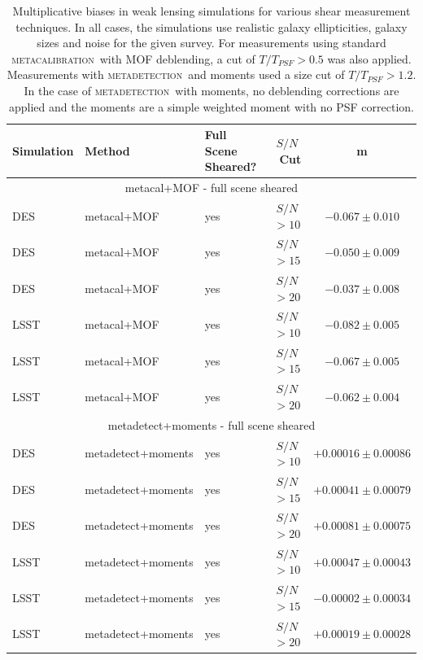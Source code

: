 \documentclass[fleqn,useAMS,usenatbib]{mnras}
\newcommand{\snr}{$S/N$}
\newcommand{\mcal}{\textsc{metacalibration}}
\newcommand{\mdet}{\textsc{metadetection}}
\begin{document}
\begin{table}
  \centering
  \caption{
    Multiplicative biases in weak lensing simulations for various shear
    measurement techniques. In all cases, the simulations use realistic
    galaxy ellipticities, galaxy sizes and noise for the given survey. For measurements using standard \mcal\ with
    MOF deblending, a cut of $T/T_{PSF} > 0.5$ was also applied. Measurements with
    \mdet\ and moments used a size cut of $T/T_{PSF} > 1.2$. In the case of \mdet\ with moments,
    no deblending corrections are applied and the moments are a simple weighted moment
    with no PSF correction.}
  \label{tab:shearmeas}

  \begin{tabular}{|l|l|l|c|c|}
    \hline
    Simulation & Method & Full Scene Sheared? & \snr\ Cut & m \\
    \hline

    \hline
    \multicolumn{5}{c}{metacal+MOF - full scene sheared}\\
    \hline
    DES   & metacal+MOF & yes & \snr$ > 10$ & $-0.067 \pm 0.010$  \\
    DES   & metacal+MOF & yes & \snr$ > 15$ & $-0.050 \pm 0.009$  \\
    DES   & metacal+MOF & yes & \snr$ > 20$ & $-0.037 \pm 0.008$  \\
    \hline
    LSST  & metacal+MOF & yes & \snr$ > 10$ & $-0.082 \pm 0.005$  \\
    LSST  & metacal+MOF & yes & \snr$ > 15$ & $-0.067 \pm 0.005$  \\
    LSST  & metacal+MOF & yes & \snr$ > 20$ & $-0.062 \pm 0.004$  \\
    \hline

    \hline
    \multicolumn{5}{c}{metadetect+moments - full scene sheared}\\
    \hline
    DES   & metadetect+moments & yes & \snr$ > 10$ & $+0.00016 \pm 0.00086$  \\
    DES   & metadetect+moments & yes & \snr$ > 15$ & $+0.00041 \pm 0.00079$  \\
    DES   & metadetect+moments & yes & \snr$ > 20$ & $+0.00081 \pm 0.00075$  \\
    \hline
    LSST  & metadetect+moments & yes & \snr$ > 10$ & $+0.00047 \pm 0.00043$  \\
    LSST  & metadetect+moments & yes & \snr$ > 15$ & $-0.00002 \pm 0.00034$  \\
    LSST  & metadetect+moments & yes & \snr$ > 20$ & $+0.00019 \pm 0.00028$  \\
    \hline


\end{tabular}
\end{table}
\end{document}
